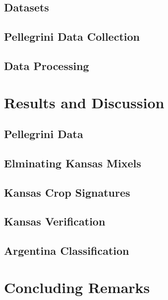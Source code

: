 \documentclass[draft,compress]{beamer}
\begin{document}
\subsection{Datasets}


\subsection{Pellegrini Data Collection}


\subsection{Data Processing}


\section{Results and Discussion}

\subsection{Pellegrini Data}

\subsection{Elminating Kansas Mixels}

\subsection{Kansas Crop Signatures}

\subsection{Kansas Verification}

\subsection{Argentina Classification}


\section{Concluding Remarks}
\end{document}
